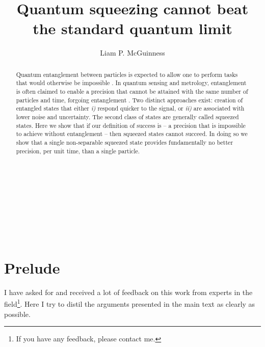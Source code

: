 \documentclass[reqno]{amsart}
\begin{document}
\title{Quantum squeezing cannot beat the standard quantum limit}

\maketitle

\begin{centering}
\author{Liam P. McGuinness}\\
\address{Laser Physics Centre, Research School of Physics, Australian National University, Acton,}\\
\address{Australian Capital Territory 2601, Australia}\\
\\
\end{centering}



\begin{abstract}
Quantum entanglement between particles is expected to allow one to perform tasks that would otherwise be impossible \cite{Bell1964,Feynman1982,Deutsch1985, Shor1994, Giovannetti2001}. In quantum sensing and metrology, entanglement is often claimed to enable a precision that cannot be attained with the same number of particles and time, forgoing entanglement \cite{Helstrom1969, Holevo1973a, Giovannetti2004, Giovannetti2006, DemkowiczDobrzanski2012, Zwierz2012, Pezze2018}. Two distinct approaches exist: creation of entangled states that either \emph{i)} respond quicker to the signal, or \emph{ii)} are associated with lower noise and uncertainty. The second class of states are generally called squeezed states. Here we show that if our definition of success is -- a precision that is impossible to achieve without entanglement -- then squeezed states cannot succeed. In doing so we show that a single non-separable squeezed state provides fundamentally no better precision, per unit time, than a single particle.\\
\end{abstract}

\section*{Prelude}
I have asked for and received a lot of feedback on this work from experts in the field\footnote{If you have any feedback, please contact me.}. Here I try to distil the arguments presented in the main text as clearly as possible.\\
\end{document}
